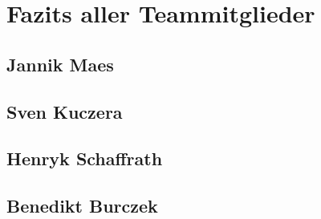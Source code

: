 \section{Fazits aller Teammitglieder}
\label{concept}

\subsection{Jannik Maes}

\subsection{Sven Kuczera}

\subsection{Henryk Schaffrath}

\subsection{Benedikt Burczek}
